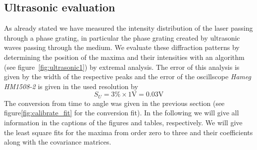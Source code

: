 \clearpage
\subsection{Ultrasonic evaluation}
As already stated we have measured the intensity distribution of the laser
passing through a phase grating, in particular the phase grating created
by ultrasonic waves passing through the medium. We evaluate these diffraction patterns
by determining the position of the maxima and their intensities with an algorithm
(see figure~\ref{fig:ultrasonic1}) by extremal analysis. The error of this analysis
is given by the width of the respective peaks and the error of the oscillscope 
\textit{Hameg HM1508-2} is given in the used resolution by
\begin{equation}
S_U = 3 \% \times 1\mathrm{V} = 0.03 \textrm{V}
\end{equation}
The conversion from time to angle was given in the previous section (see
figure\ref{fig:calibrate_fit} for the conversion fit). In the following we 
will give all information in the captions of the figures and tables, respectively.
We will give the least square fits for the maxima from order zero to three and 
their coefficients along with the covariance matrices.

